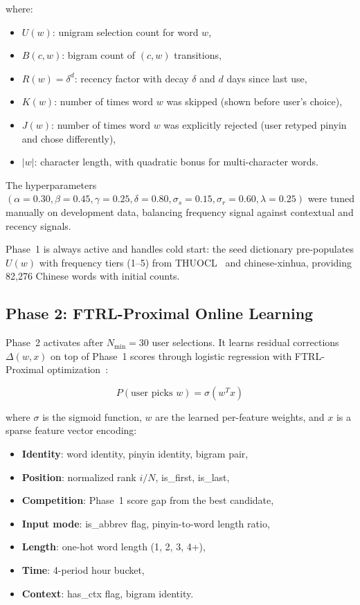 \documentclass[11pt]{article}
\begin{document}
where:
\begin{itemize}[nosep]
\item $U(w)$: unigram selection count for word $w$,
\item $B(c, w)$: bigram count of $(c, w)$ transitions,
\item $R(w) = \delta^{d}$: recency factor with decay $\delta$ and $d$ days
  since last use,
\item $K(w)$: number of times word $w$ was skipped (shown before user's choice),
\item $J(w)$: number of times word $w$ was explicitly rejected
  (user retyped pinyin and chose differently),
\item $|w|$: character length, with quadratic bonus for multi-character words.
\end{itemize}

The hyperparameters $(\alpha=0.30, \beta=0.45, \gamma=0.25, \delta=0.80,
\sigma_s=0.15, \sigma_r=0.60, \lambda=0.25)$ were tuned manually on
development data, balancing frequency signal against contextual and recency
signals.

Phase~1 is always active and handles cold start: the seed dictionary
pre-populates $U(w)$ with frequency tiers (1--5) from THUOCL~\cite{thuocl}
and chinese-xinhua, providing 82,276 Chinese words with initial counts.

\subsection{Phase 2: FTRL-Proximal Online Learning}

Phase~2 activates after $N_{\min}=30$ user selections. It learns residual
corrections $\Delta(w, x)$ on top of Phase~1 scores through logistic
regression with FTRL-Proximal optimization~\cite{ftrl}:

\begin{equation}\label{eq:ftrl}
P(\text{user picks } w) = \sigma(w^T x)
\end{equation}

where $\sigma$ is the sigmoid function, $w$ are the learned per-feature
weights, and $x$ is a sparse feature vector encoding:
\begin{itemize}[nosep]
\item \textbf{Identity}: word identity, pinyin identity, bigram pair,
\item \textbf{Position}: normalized rank $i/N$, is\_first, is\_last,
\item \textbf{Competition}: Phase~1 score gap from the best candidate,
\item \textbf{Input mode}: is\_abbrev flag, pinyin-to-word length ratio,
\item \textbf{Length}: one-hot word length (1, 2, 3, 4+),
\item \textbf{Time}: 4-period hour bucket,
\item \textbf{Context}: has\_ctx flag, bigram identity.
\end{itemize}
\end{document}

